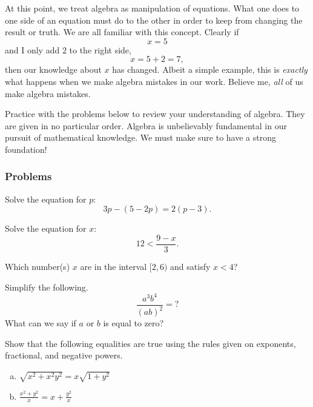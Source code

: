     At this point, we treat algebra as manipulation of equations.  What one does to one side of an equation must do to the other in order to keep from changing the result or truth.  We are all familiar with this concept.  Clearly if
    \[
    x=5
    \]
    and I only add $2$ to the right side,
    \[
    x=5+2=7,
    \]
    then our knowledge about $x$ has changed.  Albeit a simple example, this is \emph{exactly} what happens when we make algebra mistakes in our work.  Believe me, \emph{all} of us make algebra mistakes.

    Practice with the problems below to review your understanding of algebra. They are given in no particular order.  Algebra is unbelievably fundamental in our pursuit of mathematical knowledge. We must make sure to have a strong foundation!

    \subsubsection{Problems}

    \begin{problem}
    Solve the equation for $p$:
    \[
    3p-(5-2p)=2(p-3).
    \]
    \end{problem}

    \begin{problem}
    Solve the equation for $x$:
    \[
    12<\frac{9-x}{3}.
    \]
    \end{problem}

    \begin{problem}
    Which number(s) $x$ are in the interval $[2,6)$ and satisfy $x<4$?
    \end{problem}

    \begin{problem}
    Simplify the following.
    \[
    \frac{a^3b^4}{(ab)^2}=?
    \]
    What can we say if $a$ or $b$ is equal to zero?
    \end{problem}

    \begin{problem}
    Show that the following equalities are true using the rules given on exponents, fractional, and negative powers.
    \begin{enumerate}[(a)]
        \item $\displaystyle{\sqrt{x^2+x^2y^2}=x\sqrt{1+y^2}}$
        \item $\displaystyle{\frac{x^2+y^2}{x}=x+\frac{y^2}{x}}$
    \end{enumerate}
    \end{problem}


